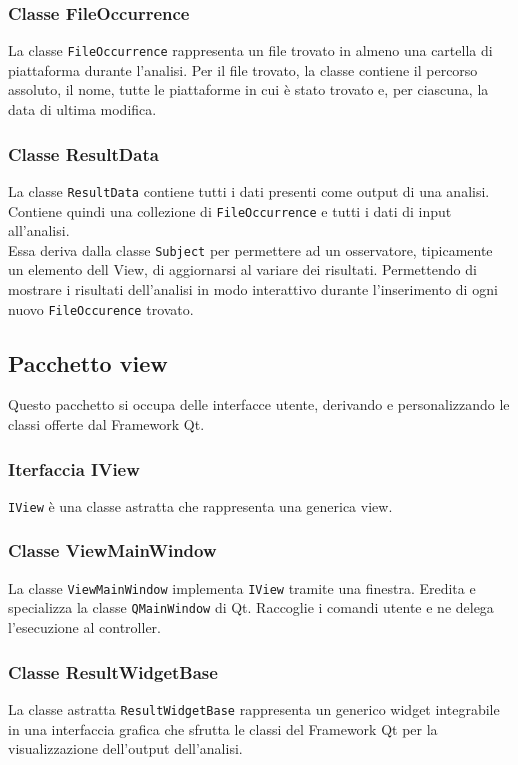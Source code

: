 		\subsubsection{Classe FileOccurrence}
			La classe \texttt{FileOccurrence} rappresenta un file trovato in almeno una cartella di piattaforma durante l'analisi. Per il file trovato, la classe contiene il percorso assoluto, il nome, tutte le piattaforme in cui è stato trovato e, per ciascuna, la data di ultima modifica. 
				
		\subsubsection{Classe ResultData}
			La classe \texttt{ResultData} contiene tutti i dati presenti come output di una analisi. Contiene quindi una collezione di \texttt{FileOccurrence} e tutti i dati di input all'analisi.\\
			Essa deriva dalla classe \texttt{Subject} per permettere ad un osservatore, tipicamente un elemento dell View, di aggiornarsi al variare dei risultati. Permettendo di mostrare i risultati dell'analisi in modo interattivo durante l'inserimento di ogni nuovo \texttt{FileOccurence} trovato.
			
	\subsection{Pacchetto view}
		Questo pacchetto si occupa delle interfacce utente, derivando e personalizzando le classi offerte dal Framework Qt.
		
		\subsubsection{Iterfaccia IView}
			\texttt{IView} è una classe astratta che rappresenta una generica view.
			
		\subsubsection{Classe ViewMainWindow}
			La classe \texttt{ViewMainWindow} implementa \texttt{IView} tramite una finestra. Eredita e specializza la classe \texttt{QMainWindow} di Qt. Raccoglie i comandi utente e ne delega l'esecuzione al controller.
			
		\subsubsection{Classe ResultWidgetBase}
			La classe astratta \texttt{ResultWidgetBase} rappresenta un generico widget integrabile in una interfaccia grafica che sfrutta le classi del Framework Qt per la visualizzazione dell'output dell'analisi.
			
